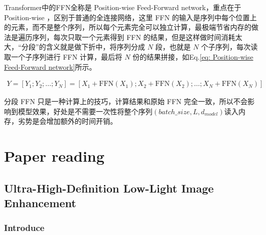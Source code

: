 \documentclass[letterpaper,10pt]{article}
\begin{document}
	Transformer中的FFN全称是 Position-wise Feed-Forward network，重点在于 Position-wise ，区别于普通的全连接网络，这里 FFN 的输入是序列中每个位置上的元素，而不是整个序列，所以每个元素完全可以独立计算，最极端节省内存的做法是遍历序列，每次只取一个元素得到 FFN 的结果，但是这样做时间消耗太大，“分段”的含义就是做下折中，将序列分成 $N$ 段，也就是 $N$ 个子序列，每次读取一个子序列进行 FFN 计算，最后将 $N$ 份的结果拼接，如Eq.\ref{eq: Position-wise Feed-Forward network}所示。
	
	\begin{equation}
		\begin{aligned}
			Y = [Y_1;Y_2;\ldots;Y_N] = [X_1 + \text{FFN}(X_1);X_2 + \text{FFN}(X_2); \ldots; X_N + \text{FFN}(X_N)]
		\end{aligned}
		\label{eq: Position-wise Feed-Forward network}
	\end{equation}
	
	分段 FFN 只是一种计算上的技巧，计算结果和原始 FFN 完全一致，所以不会影响到模型效果，好处是不需要一次性将整个序列$\left(batch\_size , L, d_{model}\right)$读入内存，劣势是会增加额外的时间开销。
	

	
	\section{Paper reading}
	
	\subsection{Ultra-High-Definition Low-Light Image Enhancement \cite{wang2022ultrahighdefinition}}
	
	\subsubsection{Introduce}
	
\end{document}
